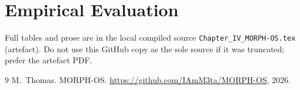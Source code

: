\documentclass[12pt,oneside]{book}
\begin{document}
\section{Empirical Evaluation}
\label{sec:emp}

Full tables and prose are in the local compiled source
\texttt{Chapter\_IV\_MORPH-OS.tex} (artefact). Do not use this GitHub
copy as the sole source if it was truncated; prefer the artefact PDF.

\begin{thebibliography}{9}
M.~Thomas. MORPH-OS.
\url{https://github.com/IAmM3ta/MORPH-OS}, 2026.
\end{thebibliography}
\end{document}
